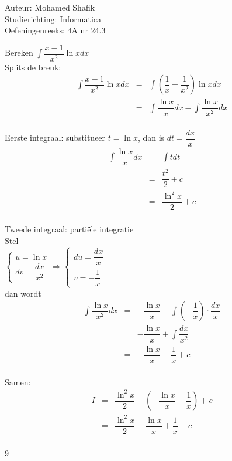 \documentclass[a4paper]{article}
\begin{document}
\noindent \large Auteur: Mohamed Shafik \\
\noindent \large Studierichting: Informatica\\
\noindent \large Oefeningenreeks: 4A nr 24.3\\

\medskip

\normalsize

Bereken $\displaystyle\int \dfrac{x-1}{x^2} \ln x dx$\\

Splits de breuk:\\

\begin{eqnarray*}
\displaystyle\int \dfrac{x-1}{x^2} \ln x dx &=& \displaystyle\int \left(\dfrac{1}{x} - \dfrac{1}{x^2}\right) \ln x dx\\
&=& \displaystyle\int \dfrac{\ln x}{x} dx - \displaystyle\int \dfrac{\ln x}{x^2} dx\\
\end{eqnarray*}

Eerste integraal: substitueer $t = \ln x$, dan is $dt = \dfrac{dx}{x}$\\

\begin{eqnarray*}
\displaystyle\int \dfrac{\ln x}{x} dx &=& \displaystyle\int t dt\\
&=& \dfrac{t^2}{2} + c\\
&=& \dfrac{\ln^2 x}{2} + c\\
\end{eqnarray*}

Tweede integraal: parti\"ele integratie\\

Stel\\

$\left\{\begin{array}{l} u = \ln x \\ dv = \dfrac{dx}{x^2} \end{array}\right. \Rightarrow \left\{\begin{array}{l} du = \dfrac{dx}{x} \\ v = -\dfrac{1}{x} \end{array}\right.$\\

dan wordt\\

\begin{eqnarray*}
\displaystyle\int \dfrac{\ln x}{x^2} dx &=& -\dfrac{\ln x}{x} - \displaystyle\int \left(-\dfrac{1}{x}\right) \cdot \dfrac{dx}{x}\\
&=& -\dfrac{\ln x}{x} + \displaystyle\int \dfrac{dx}{x^2}\\
&=& -\dfrac{\ln x}{x} - \dfrac{1}{x} + c\\
\end{eqnarray*}

Samen:\\

\begin{eqnarray*}
I &=& \dfrac{\ln^2 x}{2} - \left(-\dfrac{\ln x}{x} - \dfrac{1}{x}\right) + c\\
&=& \dfrac{\ln^2 x}{2} + \dfrac{\ln x}{x} + \dfrac{1}{x} + c\\
\end{eqnarray*}

\begin{thebibliography}{9}
\end{thebibliography}
\end{document}
